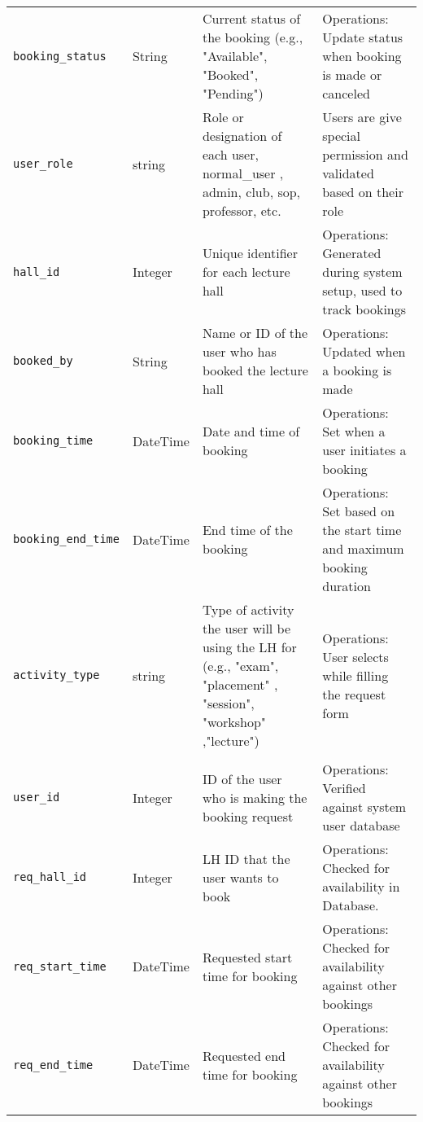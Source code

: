 \documentclass[a4paper,12pt]{article}
\begin{document}
\begin{longtable}{|>{\RaggedRight\arraybackslash}p{3.3cm}|p{2cm}|>{\RaggedRight\arraybackslash}p{5.5cm}|p{4cm}|}
    \multicolumn{4}{|c|}{\textbf{State Variables}} \\
    \hline
    \texttt{booking\_status} & String & Current status of the booking (e.g., "Available", "Booked", "Pending") & Operations: Update status when booking is made or canceled \\
    \hline
    \texttt{user\_role} & string & Role or designation of each user, normal\_user , admin, club, sop, professor, etc.& 
    Users are give special permission and validated based on their role\\
    \hline
    \texttt{hall\_id} & Integer & Unique identifier for each lecture hall & Operations: Generated during system setup, used to track bookings \\
    \hline
    \texttt{booked\_by} & String & Name or ID of the user who has booked the lecture hall & Operations: Updated when a booking is made \\
    \hline
    \texttt{booking\_time} & DateTime & Date and time of booking & Operations: Set when a user initiates a booking \\
    \hline
    \texttt{booking\_end\_time} & DateTime & End time of the booking & Operations: Set based on the start time and maximum booking duration \\
    \hline

    \texttt{activity\_type} & string & Type of activity the user will be using the LH for (e.g., "exam", "placement" , "session", "workshop" ,"lecture") & Operations: User selects while filling the request form\\
    \hline
    

    \multicolumn{4}{|c|}{\textbf{Inputs}} \\
    \hline
    \texttt{user\_id} & Integer & ID of the user who is making the booking request & Operations: Verified against system user database \\
    \hline
    \texttt{req\_hall\_id} & Integer & LH ID that the user wants to book & Operations: Checked for availability in Database. \\
    \hline
    \texttt{req\_start\_time} & DateTime & Requested start time for booking & Operations: Checked for availability against other bookings \\
    \hline
    \texttt{req\_end\_time} & DateTime & Requested end time for booking & Operations: Checked for availability against other bookings \\
    \hline


\end{longtable}
\end{document}
